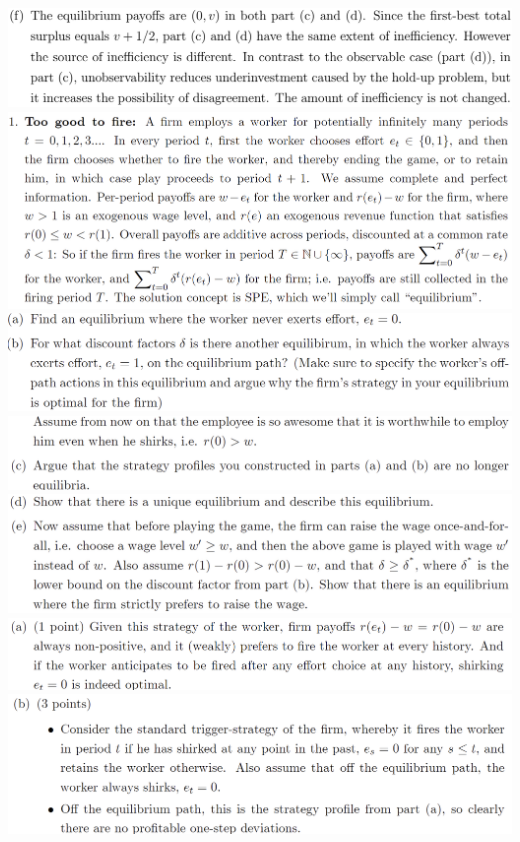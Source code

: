 \documentclass[8pt,landscape]{extarticle}
\begin{document}
\begin{multicols*}{3}
    \includegraphics[width=0.8\linewidth,keepaspectratio]{Screenshots/Screenshot 2024-03-11 195945.png}
    \includegraphics[width=0.98\linewidth,keepaspectratio]{Screenshots/Screenshot 2024-03-15 093736.png}
    \includegraphics[width=0.93\linewidth,keepaspectratio]{Screenshots/Screenshot 2024-03-15 093745.png}
    \includegraphics[width=0.94\linewidth,keepaspectratio]{Screenshots/Screenshot 2024-03-15 093751.png}
    \includegraphics[width=0.94\linewidth,keepaspectratio]{Screenshots/Screenshot 2024-03-15 093756.png}
    \includegraphics[width=0.95\linewidth,keepaspectratio]{Screenshots/Screenshot 2024-03-15 093802.png}
    \includegraphics[width=0.96\linewidth,keepaspectratio]{Screenshots/Screenshot 2024-03-15 093808.png}

\end{multicols*}
\end{document}
